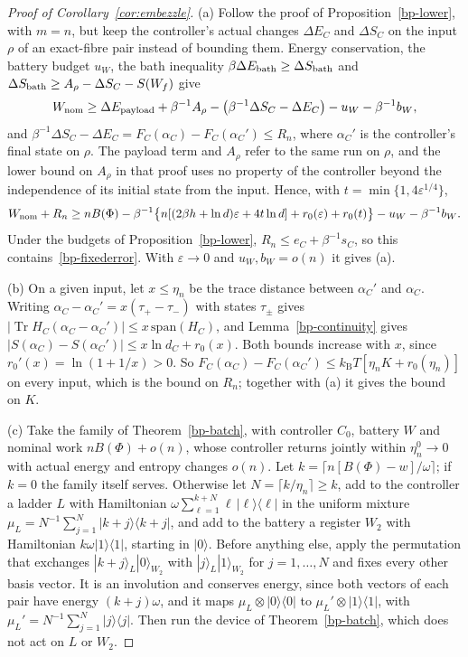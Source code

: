 \documentclass[11pt]{article}
\theoremstyle{definition}
\theoremstyle{remark}
\newcommand{\Tr}{\operatorname{Tr}}
\newcommand{\kB}{k_{\mathrm B}}
\begin{document}
\begin{proof}[Proof of Corollary~\ref{cor:embezzle}]
(a) Follow the proof of Proposition~\ref{bp-lower}, with $m=n$, but keep the controller's actual changes $\Delta E_C$ and $\Delta S_C$ on the input $\rho$ of an exact-fibre pair instead of bounding them. Energy conservation, the battery budget $u_W$, the bath inequality $\beta\Delta E_{\rm bath}\ge\Delta S_{\rm bath}$ and $\Delta S_{\rm bath}\ge A_\rho-\Delta S_C-S(W_f)$ give
\[
W_{\rm nom}\ge\Delta E_{\rm payload}+\beta^{-1}A_\rho-\bigl(\beta^{-1}\Delta S_C-\Delta E_C\bigr)-u_W-\beta^{-1}b_W,
\]
and $\beta^{-1}\Delta S_C-\Delta E_C=F_C(\alpha_C)-F_C(\alpha_C')\le R_n$, where $\alpha_C'$ is the controller's final state on $\rho$. The payload term and $A_\rho$ refer to the same run on $\rho$, and the lower bound on $A_\rho$ in that proof uses no property of the controller beyond the independence of its initial state from the input. Hence, with $t=\min\{1,4\varepsilon^{1/4}\}$,
\[
W_{\rm nom}+R_n\ge nB(\Phi)-\beta^{-1}\bigl\{n[(2\beta h+\ln d)\varepsilon+4t\ln d]+r_0(\varepsilon)+r_0(t)\bigr\}-u_W-\beta^{-1}b_W.
\]
Under the budgets of Proposition~\ref{bp-lower}, $R_n\le e_C+\beta^{-1}s_C$, so this contains~\eqref{bp-fixederror}. With $\varepsilon\to0$ and $u_W,b_W=o(n)$ it gives (a).

(b) On a given input, let $x\le\eta_n$ be the trace distance between $\alpha_C'$ and $\alpha_C$. Writing $\alpha_C-\alpha_C'=x(\tau_+-\tau_-)$ with states $\tau_\pm$ gives $|\Tr H_C(\alpha_C-\alpha_C')|\le x\,\mathrm{span}(H_C)$, and Lemma~\ref{bp-continuity} gives $|S(\alpha_C)-S(\alpha_C')|\le x\ln d_C+r_0(x)$. Both bounds increase with $x$, since $r_0'(x)=\ln(1+1/x)>0$. So $F_C(\alpha_C)-F_C(\alpha_C')\le\kB T[\eta_nK+r_0(\eta_n)]$ on every input, which is the bound on $R_n$; together with (a) it gives the bound on $K$.

(c) Take the family of Theorem~\ref{bp-batch}, with controller $C_0$, battery $W$ and nominal work $nB(\Phi)+o(n)$, whose controller returns jointly within $\eta^0_n\to0$ with actual energy and entropy changes $o(n)$. Let $k=\lceil n[B(\Phi)-w]/\omega\rceil$; if $k=0$ the family itself serves. Otherwise let $N=\lceil k/\eta_n\rceil\ge k$, add to the controller a ladder $L$ with Hamiltonian $\omega\sum_{\ell=1}^{k+N}\ell\,|\ell\rangle\langle\ell|$ in the uniform mixture $\mu_L=N^{-1}\sum_{j=1}^N|k+j\rangle\langle k+j|$, and add to the battery a register $W_2$ with Hamiltonian $k\omega|1\rangle\langle1|$, starting in $|0\rangle$. Before anything else, apply the permutation that exchanges $|k+j\rangle_L|0\rangle_{W_2}$ with $|j\rangle_L|1\rangle_{W_2}$ for $j=1,\dots,N$ and fixes every other basis vector. It is an involution and conserves energy, since both vectors of each pair have energy $(k+j)\omega$, and it maps $\mu_L\otimes|0\rangle\langle0|$ to $\mu_L'\otimes|1\rangle\langle1|$, with $\mu_L'=N^{-1}\sum_{j=1}^N|j\rangle\langle j|$. Then run the device of Theorem~\ref{bp-batch}, which does not act on $L$ or $W_2$.


\end{proof}
\end{document}
